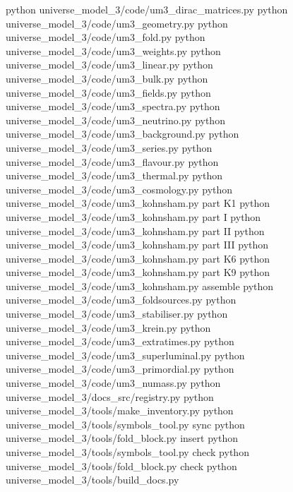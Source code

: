 \documentclass[
  10pt,
]{article}
\newenvironment{Shaded}{}{}
\newcommand{\NormalTok}[1]{#1}
\begin{document}
\begin{Shaded}
\begin{Highlighting}[]
\NormalTok{python universe\_model\_3/code/um3\_dirac\_matrices.py}
\NormalTok{python universe\_model\_3/code/um3\_geometry.py}
\NormalTok{python universe\_model\_3/code/um3\_fold.py}
\NormalTok{python universe\_model\_3/code/um3\_weights.py}
\NormalTok{python universe\_model\_3/code/um3\_linear.py}
\NormalTok{python universe\_model\_3/code/um3\_bulk.py}
\NormalTok{python universe\_model\_3/code/um3\_fields.py}
\NormalTok{python universe\_model\_3/code/um3\_spectra.py}
\NormalTok{python universe\_model\_3/code/um3\_neutrino.py}
\NormalTok{python universe\_model\_3/code/um3\_background.py}
\NormalTok{python universe\_model\_3/code/um3\_series.py}
\NormalTok{python universe\_model\_3/code/um3\_flavour.py}
\NormalTok{python universe\_model\_3/code/um3\_thermal.py}
\NormalTok{python universe\_model\_3/code/um3\_cosmology.py}
\NormalTok{python universe\_model\_3/code/um3\_kohnsham.py part K1}
\NormalTok{python universe\_model\_3/code/um3\_kohnsham.py part I}
\NormalTok{python universe\_model\_3/code/um3\_kohnsham.py part II}
\NormalTok{python universe\_model\_3/code/um3\_kohnsham.py part III}
\NormalTok{python universe\_model\_3/code/um3\_kohnsham.py part K6}
\NormalTok{python universe\_model\_3/code/um3\_kohnsham.py part K9}
\NormalTok{python universe\_model\_3/code/um3\_kohnsham.py assemble}
\NormalTok{python universe\_model\_3/code/um3\_foldsources.py}
\NormalTok{python universe\_model\_3/code/um3\_stabiliser.py}
\NormalTok{python universe\_model\_3/code/um3\_krein.py}
\NormalTok{python universe\_model\_3/code/um3\_extratimes.py}
\NormalTok{python universe\_model\_3/code/um3\_superluminal.py}
\NormalTok{python universe\_model\_3/code/um3\_primordial.py}
\NormalTok{python universe\_model\_3/code/um3\_numass.py}
\NormalTok{python universe\_model\_3/docs\_src/registry.py}
\NormalTok{python universe\_model\_3/tools/make\_inventory.py}
\NormalTok{python universe\_model\_3/tools/symbols\_tool.py sync}
\NormalTok{python universe\_model\_3/tools/fold\_block.py insert}
\NormalTok{python universe\_model\_3/tools/symbols\_tool.py check}
\NormalTok{python universe\_model\_3/tools/fold\_block.py check}
\NormalTok{python universe\_model\_3/tools/build\_docs.py}
\end{Highlighting}
\end{Shaded}
\end{document}
